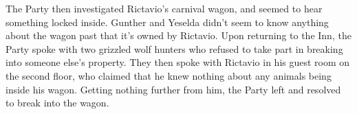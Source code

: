 \documentclass[a4paper,11pt]{article}
\begin{document}
The Party then investigated Rictavio's carnival wagon, and seemed to hear something locked inside. Gunther and 
Yeselda didn't seem to know anything about the wagon past that it's owned by Rictavio. Upon returning to the Inn,
the Party spoke with two grizzled wolf hunters who refused to take part in breaking into someone else's property. 
They then spoke with Rictavio in his guest room on the second floor, who claimed that he knew nothing about any 
animals being inside his wagon. Getting nothing further from him, the Party left and resolved to break into the 
wagon.
\end{document}
